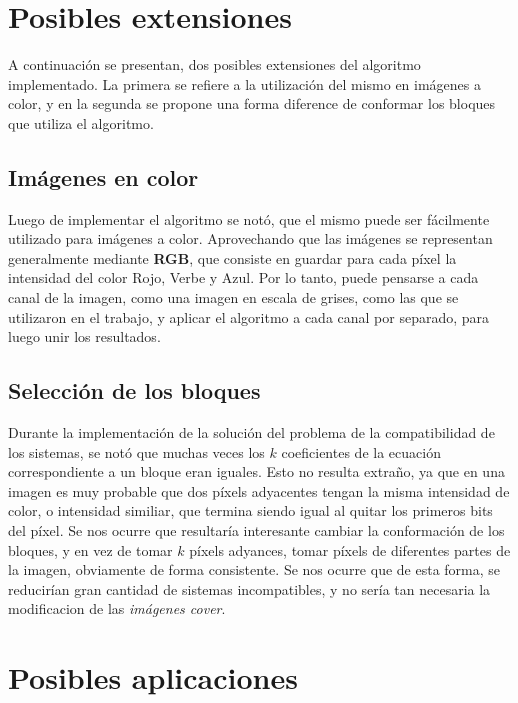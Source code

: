 \documentclass{article}
\begin{document}
\section{Posibles extensiones}

A continuación se presentan, dos posibles extensiones del algoritmo implementado. La primera se refiere a la utilización del mismo en imágenes
a color, y en la segunda se propone una forma diference de conformar los bloques que utiliza el algoritmo.

\subsection{Imágenes en color}

Luego de implementar el algoritmo se notó, que el mismo puede ser fácilmente utilizado para imágenes a color. Aprovechando que las imágenes
se representan generalmente mediante \textbf{RGB}, que consiste en guardar para cada píxel la intensidad del color Rojo, Verbe y Azul. Por lo tanto,
puede pensarse a cada canal de la imagen, como una imagen en escala de grises, como las que se utilizaron en el trabajo, y aplicar el algoritmo a 
cada canal por separado, para luego unir los resultados.

\subsection{Selección de los bloques}

Durante la implementación de la solución del problema de la compatibilidad de los sistemas, se notó que muchas veces los $k$ coeficientes de la ecuación
correspondiente a un bloque eran iguales. Esto no resulta extraño, ya que en una imagen es muy probable que dos píxels adyacentes tengan la misma intensidad
de color, o intensidad similiar, que termina siendo igual al quitar los primeros bits del píxel. Se nos ocurre que resultaría interesante cambiar la conformación 
de los bloques, y en vez de tomar $k$ píxels adyances, tomar píxels de diferentes partes de la imagen, obviamente de forma consistente. Se nos ocurre 
que de esta forma, se reducirían gran cantidad de sistemas incompatibles, y no sería tan necesaria la modificacion de las \emph{imágenes cover}.

\section{Posibles aplicaciones}
\end{document}
